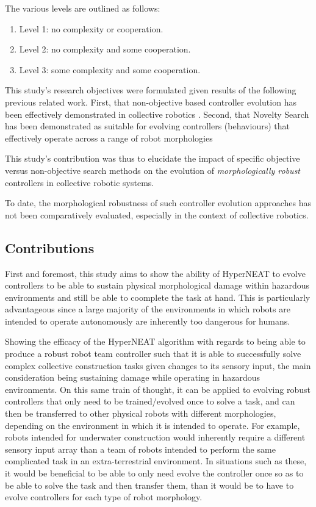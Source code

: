 The various levels are outlined as follows:
\begin{enumerate}
	\item Level 1: no complexity or cooperation.
	\item Level 2: no complexity and some cooperation.
	\item Level 3: some complexity and some cooperation.
\end{enumerate}

This study's research objectives were formulated given results of the following previous related work. First, that non-objective based controller evolution has been effectively demonstrated in collective robotics \cite{RefWorks:11, gomes2013generic, RefWorks:5}.
Second, that Novelty Search has been demonstrated as suitable for evolving controllers (behaviours) that effectively operate across a range of robot morphologies



This study's contribution was thus to elucidate the impact of specific objective versus non-objective search methods on the evolution of \textit{morphologically robust} controllers in collective robotic systems. 

To date, the morphological robustness of such controller evolution approaches has not been comparatively evaluated, especially in the context of collective robotics. 


\subsection{Contributions}

First and foremost, this study aims to show the ability of HyperNEAT to evolve controllers to be able to sustain physical morphological damage within hazardous environments and still be able to coomplete the task at hand. This is particularly advantageous since a large majority of the environments in which robots are intended to operate autonomously are inherently too dangerous for humans.

Showing the efficacy of the HyperNEAT algorithm with regards to being able to produce a robust robot team controller such that it is able to successfully solve complex collective construction tasks given changes to its sensory input, the main consideration being sustaining damage while operating in hazardous environments. On this same train of thought, it can be applied to evolving robust controllers that only need to be trained/evolved once to solve a task, and can then be transferred to other physical robots with different morphologies, depending on the environment in which it is intended to operate. For example, robots intended for underwater construction would inherently require a different sensory input array than a team of robots intended to perform the same complicated task in an extra-terrestrial environment. In situations such as these, it would be beneficial to be able to only need evolve the controller once so as to be able to solve the task and then transfer them, than it would be to have to evolve controllers for each type of robot morphology.


